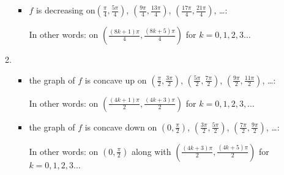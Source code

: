 \documentclass{ximera}
\begin{document}
\begin{enumerate}
\begin{enumerate}
\begin{itemize}
\item $f$ is decreasing on$\left(\frac{\pi}{4}, \frac{5 \pi}{4} \right)$, $\left(\frac{9\pi}{4}, \frac{13 \pi}{4} \right)$, $\left(\frac{17\pi}{4}, \frac{21\pi}{4} \right)$, \ldots : 

\smallskip

In other words:  on $\left( \frac{(8k+1) \pi}{4}, \frac{(8k+5)\pi}{4}\right)$ for $k  = 0, 1, 2, 3 \ldots$

\end{itemize}

\item   \begin{itemize} \item the graph of $f$ is concave up on $\left(\frac{\pi}{2}, \frac{3\pi}{2} \right)$, $\left(\frac{5\pi}{2}, \frac{7 \pi}{2} \right)$, $\left(\frac{9\pi}{2}, \frac{11 \pi}{2} \right)$, \ldots :  

\smallskip

In other words: on  $\left( \frac{(4k+1) \pi}{2}, \frac{(4k+3)\pi}{2}\right)$ for $k = 0,1, 2, 3, \ldots$

\item the graph of $f$ is concave down on  $\left(0, \frac{\pi}{2} \right)$, $\left(\frac{3\pi}{2}, \frac{5 \pi}{2} \right)$, $\left(\frac{7 \pi}{2}, \frac{9\pi}{2} \right)$, \ldots : 

\smallskip

In other words:  on $\left(0, \frac{\pi}{2} \right)$ along with $\left( \frac{(4k+3) \pi}{2}, \frac{(4k+5)\pi}{2}\right)$ for $k  = 0, 1, 2, 3 \ldots$

\end{itemize}

\end{enumerate}


\end{enumerate} 
\end{document}
